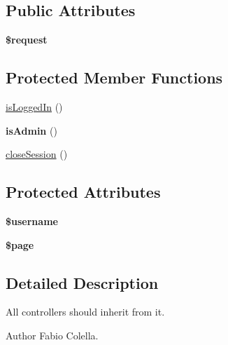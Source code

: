 \subsection*{Public Attributes}
\begin{DoxyCompactItemize}
\item 
\hypertarget{classController_ae09902e0cf33dbffd52349e056794842}{{\bfseries \$request}}\label{classController_ae09902e0cf33dbffd52349e056794842}

\end{DoxyCompactItemize}
\subsection*{Protected Member Functions}
\begin{DoxyCompactItemize}
\item 
\hyperlink{classController_a014e1cea4dd7e6fb8fad83cdce9c6216}{is\+Logged\+In} ()
\item 
\hypertarget{classController_a5c1d8729360dbfe66bff62d7a60600d7}{{\bfseries is\+Admin} ()}\label{classController_a5c1d8729360dbfe66bff62d7a60600d7}

\item 
\hyperlink{classController_a67beb590eef4f36b07e6c9ef04fc8337}{close\+Session} ()
\end{DoxyCompactItemize}
\subsection*{Protected Attributes}
\begin{DoxyCompactItemize}
\item 
\hypertarget{classController_add0ea4a4a72b2f7cf707bdd435a67c61}{{\bfseries \$username}}\label{classController_add0ea4a4a72b2f7cf707bdd435a67c61}

\item 
\hypertarget{classController_a82584774d202d57e2e5159fa2add1079}{{\bfseries \$page}}\label{classController_a82584774d202d57e2e5159fa2add1079}

\end{DoxyCompactItemize}


\subsection{Detailed Description}
All controllers should inherit from it.

\begin{DoxyAuthor}{Author}
Fabio Colella. 
\end{DoxyAuthor}



